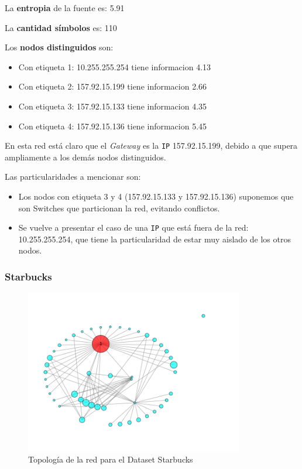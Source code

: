 La \textbf{entropia} de la fuente es: 5.91

La \textbf{cantidad símbolos} es: 110

Los \textbf{nodos distinguidos} son:

\begin{itemize}
    \item Con etiqueta 1: 10.255.255.254 tiene informacion 4.13
    \item Con etiqueta 2: 157.92.15.199 tiene informacion 2.66
    \item Con etiqueta 3: 157.92.15.133 tiene informacion 4.35
    \item Con etiqueta 4: 157.92.15.136 tiene informacion 5.45
\end{itemize}

En esta red está claro que el \textit{Gateway} es la \texttt{IP} 157.92.15.199, debido a que
supera ampliamente a los demás nodos distinguidos.

Las particularidades a mencionar son:
\begin{itemize}
    \item Los nodos con etiqueta 3 y 4 (157.92.15.133 y 157.92.15.136) suponemos
        que son Switches que particionan la red, evitando conflictos.
    \item  Se vuelve a presentar el caso de una \texttt{IP} que está fuera de la red: 10.255.255.254, que tiene la particularidad de estar muy aislado de los otros nodos.
\end{itemize}



\subsubsection{Starbucks}

\begin{figure}[H]
    \centering
    \includegraphics[width=0.85\textwidth]{imagenes/starbucks.png}
    \caption{Topología de la red para el Dataset Starbucks}
\end{figure}

